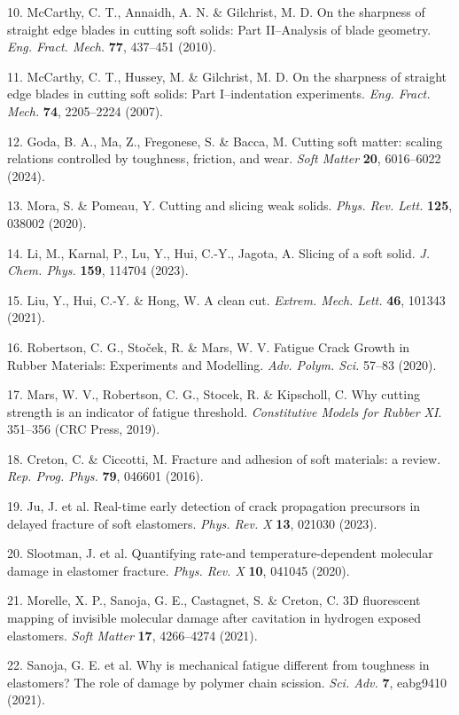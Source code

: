 \documentclass{article}
\begin{document}
\begin{hangpars}
10. McCarthy, C. T., Annaidh, A. N. \& Gilchrist, M. D. On the sharpness of straight edge blades in cutting soft solids: Part II–Analysis of blade geometry. \emph{Eng. Fract. Mech.} \textbf{77}, 437–451 (2010).

11. McCarthy, C. T., Hussey, M. \& Gilchrist, M. D. On the sharpness of straight edge blades in cutting soft solids: Part I–indentation experiments. \emph{Eng. Fract. Mech.} \textbf{74}, 2205–2224 (2007).

12. Goda, B. A., Ma, Z., Fregonese, S. \& Bacca, M. Cutting soft matter: scaling relations controlled by toughness, friction, and wear. \emph{Soft Matter} \textbf{20}, 6016–6022 (2024).

13. Mora, S. \& Pomeau, Y. Cutting and slicing weak solids. \emph{Phys. Rev. Lett.} \textbf{125}, 038002 (2020).

14. Li, M., Karnal, P., Lu, Y., Hui, C.-Y., Jagota, A. Slicing of a soft solid. \emph{J. Chem. Phys.} \textbf{159}, 114704 (2023).

15. Liu, Y., Hui, C.-Y. \& Hong, W. A clean cut. \emph{Extrem. Mech. Lett.} \textbf{46}, 101343 (2021).

16. Robertson, C. G., Stoček, R. \& Mars, W. V. Fatigue Crack Growth in Rubber Materials: Experiments and Modelling. \emph{Adv. Polym. Sci.} 57–83 (2020).

17. Mars, W. V., Robertson, C. G., Stocek, R. \& Kipscholl, C. Why cutting strength is an indicator of fatigue threshold. \emph{Constitutive Models for Rubber XI}. 351–356 (CRC Press, 2019).

18. Creton, C. \& Ciccotti, M. Fracture and adhesion of soft materials: a review. \emph{Rep. Prog. Phys.} \textbf{79}, 046601 (2016).

19. Ju, J. et al. Real-time early detection of crack propagation precursors in delayed fracture of soft elastomers. \emph{Phys. Rev. X} \textbf{13}, 021030 (2023).

20. Slootman, J. et al. Quantifying rate-and temperature-dependent molecular damage in elastomer fracture. \emph{Phys. Rev. X} \textbf{10}, 041045 (2020).

21. Morelle, X. P., Sanoja, G. E., Castagnet, S. \& Creton, C. 3D fluorescent mapping of invisible molecular damage after cavitation in hydrogen exposed elastomers. \emph{Soft Matter} \textbf{17}, 4266–4274 (2021).

22. Sanoja, G. E. et al. Why is mechanical fatigue different from toughness in elastomers? The role of damage by polymer chain scission. \emph{Sci. Adv.} \textbf{7}, eabg9410 (2021).


\end{hangpars}
\end{document}
